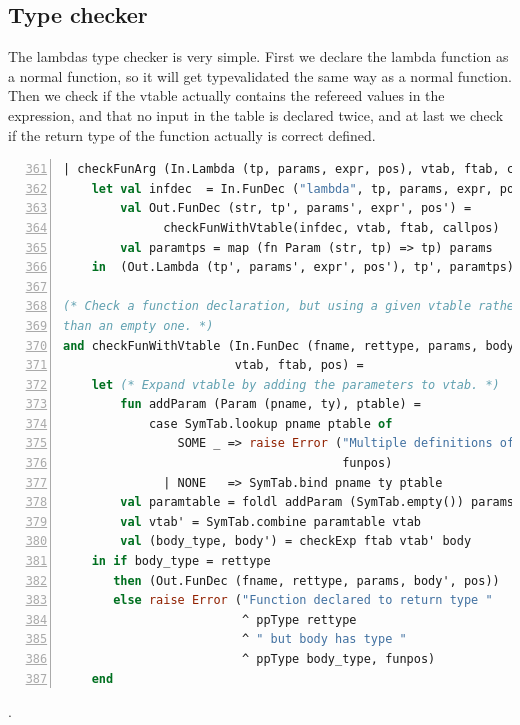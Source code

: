 \documentclass[11pt]{article}
\begin{document}
\subsection{Type checker}
The lambdas type checker is very simple. First we declare the lambda function as a normal function, so
it will get typevalidated the same way as a normal function.
Then we check if the vtable actually contains the refereed values in the expression, and that no input in
the table is declared twice, and at last we check if the return type of the function actually is correct defined.
 \begin{lstlisting}[language=ML,basicstyle=\footnotesize,caption={Lambda in TypeChecker.sml },firstnumber=361,breaklines=false,numbers=left]
  | checkFunArg (In.Lambda (tp, params, expr, pos), vtab, ftab, callpos) =
    let val infdec  = In.FunDec ("lambda", tp, params, expr, pos)
        val Out.FunDec (str, tp', params', expr', pos') =
              checkFunWithVtable(infdec, vtab, ftab, callpos)
        val paramtps = map (fn Param (str, tp) => tp) params
    in  (Out.Lambda (tp', params', expr', pos'), tp', paramtps) end

(* Check a function declaration, but using a given vtable rather
than an empty one. *)
and checkFunWithVtable (In.FunDec (fname, rettype, params, body, funpos),
                        vtab, ftab, pos) =
    let (* Expand vtable by adding the parameters to vtab. *)
        fun addParam (Param (pname, ty), ptable) =
            case SymTab.lookup pname ptable of
                SOME _ => raise Error ("Multiple definitions of parameter name " ^ pname,
                                       funpos)
              | NONE   => SymTab.bind pname ty ptable
        val paramtable = foldl addParam (SymTab.empty()) params
        val vtab' = SymTab.combine paramtable vtab
        val (body_type, body') = checkExp ftab vtab' body
    in if body_type = rettype
       then (Out.FunDec (fname, rettype, params, body', pos))
       else raise Error ("Function declared to return type "
                         ^ ppType rettype
                         ^ " but body has type "
                         ^ ppType body_type, funpos)
    end

\end{lstlisting}
.
\end{document}
